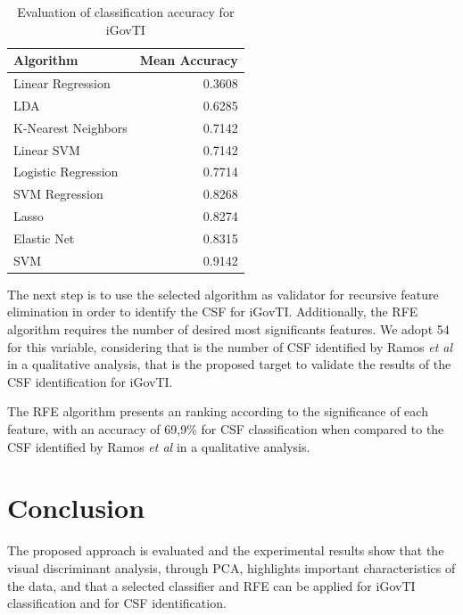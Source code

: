 \begin{table}[!t]
	\caption{Evaluation of classification accuracy for iGovTI}
  	\label{tab:ch2_tab1}
	\centering
	\begin{tabular}{|l|r|}
		\hline \rowcolor{Gray} Algorithm	& Mean Accuracy\\\hline
		Linear Regression \cite{draper2014applied}	&0.3608\\ \hline
		LDA \cite{martinez2001pca}	&0.6285\\ \hline
		K-Nearest Neighbors \cite{fukunaga1975branch}	&0.7142\\ \hline
		Linear SVM \cite{fan2008liblinear}	&0.7142\\ \hline
		Logistic Regression \cite{hosmer2013applied}	&0.7714\\ \hline
		SVM Regression \cite{smola2004tutorial}	&0.8268\\ \hline
		Lasso \cite{tibshirani1996regression}	&0.8274\\ \hline
		Elastic Net \cite{zou2005regularization}	&0.8315\\ \hline
		SVM \cite{hearst1998support}	&0.9142\\ \hline
	\end{tabular}
\end{table}

The next step is to use the selected algorithm as validator for recursive feature elimination in order to identify the CSF for iGovTI. Additionally, the RFE algorithm requires the number of desired most significants features. We adopt 54 for this variable, considering that is the number of CSF identified by Ramos \emph{et al} \cite{ramos2016information} in a qualitative analysis, that is the proposed target to validate the results of the CSF identification for iGovTI.

The RFE algorithm presents an ranking according to the significance of each feature, with an accuracy of 69,9\% for CSF classification when compared to the CSF identified by Ramos \emph{et al} \cite{ramos2016information} in a qualitative analysis.


\section{Conclusion}
\label{sec:b_conclusion}

The proposed approach is evaluated and the experimental results show that the visual discriminant analysis, through PCA, highlights important characteristics of the data, and that a selected classifier and RFE can be applied for iGovTI classification and for CSF identification. 

